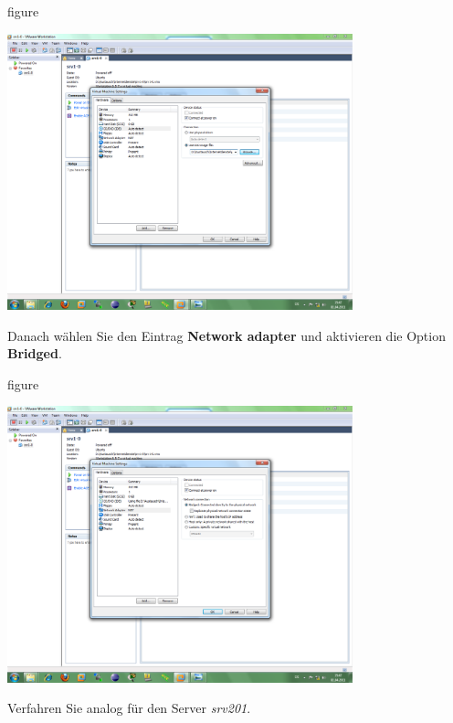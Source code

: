\begin{nofloat}{figure}
\begin{center}
\includegraphics[width=0.75\textwidth]{screenshots/vm09.png}
\end{center}
\end{nofloat}

Danach wählen Sie den Eintrag \textbf{Network adapter} und aktivieren die Option
\textbf{Bridged}.

\begin{nofloat}{figure}
\begin{center}
\includegraphics[width=0.75\textwidth]{screenshots/vm10.png}
\end{center}
\end{nofloat}

Verfahren Sie analog für den Server \textit{srv201}.

